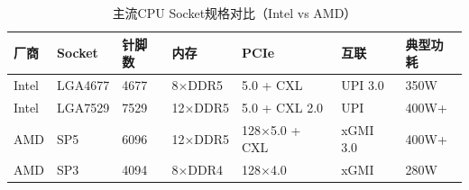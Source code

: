 \documentclass[12pt,UTF8]{ctexbook}
\begin{document}
\begin{table}[H]
  \centering
  \begin{tabular}{|p{1.5cm}|p{2cm}|p{1.5cm}|p{2.5cm}|p{2.5cm}|p{1.8cm}|p{2cm}|}
    \hline
    \textbf{厂商} & \textbf{Socket} & \textbf{针脚数} & \textbf{内存} & \textbf{PCIe} & \textbf{互联} & \textbf{典型功耗} \\
    \hline
    Intel & LGA4677 & 4677 & 8×DDR5 & 5.0 + CXL & UPI 3.0 & 350W \\
    \hline
    Intel & LGA7529 & 7529 & 12×DDR5 & 5.0 + CXL 2.0 & UPI & 400W+ \\
    \hline
    AMD & SP5 & 6096 & 12×DDR5 & 128×5.0 + CXL & xGMI 3.0 & 400W+ \\
    \hline
    AMD & SP3 & 4094 & 8×DDR4 & 128×4.0 & xGMI & 280W \\
    \hline
  \end{tabular}
  \caption{主流CPU Socket规格对比（Intel vs AMD）}
  \label{tab:socket_comparison}
\end{table}

\backmatter
\end{document}
